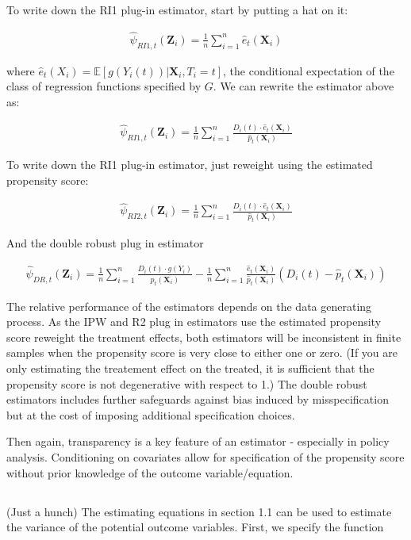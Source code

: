 \documentclass[12pt]{article}
\newcommand{\E}{\mathbb{E}}
\newcommand{\X}{\mathbf{X}}
\newcommand{\qsum}{\sum\limits_{i=1}^n}
\begin{document}
To write down the RI1 plug-in estimator, start by putting a hat on it:

\begin{align*}
\hat\psi_{RI1,t}(\mathbf{Z}_i) =\frac{1}{n}\qsum \hat e_t(\X_i)
\end{align*}

where $\hat e_t(X_i) = \E[g(Y_i(t))|\X_i, T_i =t]$, the conditional expectation of the class of regression functions specified by $G$. We can rewrite the estimator above as:

\begin{align*}
\hat\psi_{RI1,t}(\mathbf{Z}_i) = \frac{1}{n}\qsum\frac{D_i(t) \cdot \hat e_t(\X_i)}{\hat p_t(\X_i)}
\end{align*}

To write down the RI1 plug-in estimator, just reweight using the estimated propensity score:

\begin{align*}
\hat\psi_{RI2,t}(\mathbf{Z}_i) = \frac{1}{n}\qsum\frac{D_i(t) \cdot \hat e_t(\X_i)}{\hat p_t(\X_i)}
\end{align*}

And the double robust plug in estimator

\begin{align*}
\hat\psi_{DR,t}(\mathbf{Z}_i) = \frac{1}{n}\qsum\frac{D_i(t) \cdot g(Y_i)}{\hat p_t(\X_i)}
-\frac{1}{n}\qsum\frac{\hat e_t(\X_i)}{\hat p_t(\X_i)} (D_i(t) - \hat p_t(\X_i))
\end{align*}

The relative performance of the estimators depends on the data generating process.
As the IPW and R2 plug in estimators use the estimated propensity score reweight the treatment effects, both estimators will be inconsistent in finite samples when the propensity score is very close to either one or zero. (If you are only estimating the treatement effect on the treated, it is sufficient that the propensity score is not degenerative with respect to 1.) The double robust estimators includes further safeguards against bias induced by misspecification but at the cost of imposing additional specification choices.

Then again, transparency is a key feature of an estimator - especially in policy analysis. Conditioning on covariates allow for specification of the propensity score without prior knowledge of the outcome variable/equation.

\subsection{}
(Just a hunch)
The estimating equations in section 1.1 can be used to estimate the variance of the potential outcome variables. First, we specify the function
\end{document}
